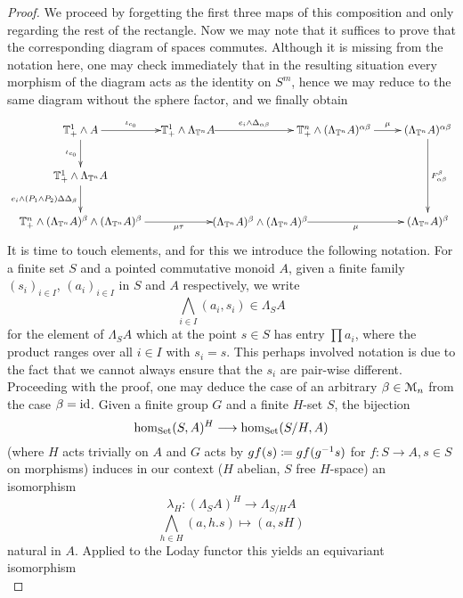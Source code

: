 \begin{proof}
We proceed by forgetting the first three maps of this composition and only regarding the rest of the rectangle. Now we may note that it suffices to prove that the corresponding diagram of spaces commutes. Although it is missing from the notation here, one may check immediately that in the resulting situation every morphism of the diagram acts as the identity on $S^m$, hence we may reduce to the same diagram without the sphere factor, and we finally obtain
\begin{equation*}
\xymatrix{
	\sT^1_+ \wedge A%
		\ar[r]^-{\iota_{c_0}}
		\ar[d]_-{\iota_{c_0}}
	&
	*!(10,0){\sT^1_+ \wedge \Lambda_{\sT^n} A}%
		\ar[r]^-{e_i \wedge \Delta_{\alpha\beta}}%
	&
	\sT^n_+ \wedge (\Lambda_{\sT^n} A)^{\alpha\beta}
		\ar[r]^-{\mu}%
	&
	(\Lambda_{\sT^n} A)^{\alpha\beta}
		\ar[dd]^{F_{\alpha\beta}^\beta}%
	\\%
	\sT^1_+ \wedge \Lambda_{\sT^n} A%
		\ar[d]_{e_i \wedge ( P_1 \wedge P_2) \Delta \Delta_\beta }%
	&
	&
	&
	\\%
	\sT^n_+ \wedge (\Lambda_{\sT^n} A)^\beta \wedge (\Lambda_{\sT^n} A)^\beta%
		\ar[r]_-{\mu \tau}%
	&
	*!(-13,0){(\Lambda_{\sT^n} A)^\beta \wedge (\Lambda_{\sT^n} A)^\beta}%
		\ar[rr]_-{\mu}%
	&
	&
	(\Lambda_{\sT^n} A)^\beta
}
\end{equation*}
It is time to touch elements, and for this we introduce the following notation. For a finite set $S$ and a pointed commutative monoid $A$, given a finite family $(s_i)_{i \in I}$, $(a_i)_{i \in I}$ in $S$ and $A$ respectively, we write
	\[ \bigwedge_{i \in I} (a_i, s_i) \in \Lambda_S A 	\]
for the element of $\Lambda_S A$ which at the point $s \in S$ has entry $\prod a_i$, where the product ranges over all $i \in I$ with $s_i = s$. This perhaps involved notation is due to the fact that we cannot always ensure that the $s_i$ are pair-wise different.\\
Proceeding with the proof, one may deduce the case of an arbitrary $\beta \in \mathcal{M}_n$ from the case $\beta = \operatorname{id}$. Given a finite group $G$ and a finite $H$-set $S$, the bijection
	\[ \operatorname{hom}_{\mathrm{Set}} (S,A)^{H} \longrightarrow \operatorname{hom}_{\mathrm{Set}} (S/H,A)\]
(where $H$ acts trivially on $A$ and $G$ acts by $g f(s) \coloneqq gf(g^{-1}s)$ for $f:S \to A, s \in S$ on morphisms) induces in our context ($H$ abelian, $S$ free $H$-space) an isomorphism
	\[ \lambda_H: ( \Lambda_{S} A )^H \to \Lambda_{S / H} A \]
	\[	\bigwedge_{h \in H} (a,h . s) \mapsto (a,sH) \]
natural in $A$. Applied to the Loday functor this yields an equivariant isomorphism
\begin{equation*}

\end{equation*}
\end{proof}
